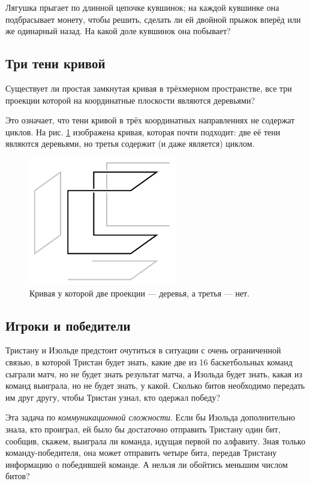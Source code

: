 Лягушка прыгает по длинной цепочке кувшинок;
на каждой кувшинке она подбрасывает монету, чтобы решить,
сделать ли ей двойной прыжок вперёд или же одинарный назад.
На какой доле кувшинок она побывает?

\subsection*{Три тени кривой}\label{Три тени кривой}

Существует ли простая замкнутая кривая в трёхмерном пространстве, все три проекции которой на координатные плоскости являются деревьями?

Это означает, что тени кривой в трёх координатных направлениях не содержат циклов.
На рис. \ref{pic:proj1} изображена кривая, которая почти подходит: две её тени являются деревьями, но третья содержит (и даже является) циклом.

\begin{figure}[htb!]
\centering
\includegraphics[scale=1]{pics/proj1}
\caption{Кривая у которой две проекции --- деревья, а третья --- нет.}
\label{pic:proj1}
\end{figure}

\subsection*{Игроки и победители}

Тристану и Изольде предстоит очутиться в ситуации с очень ограниченной связью, в которой Тристан будет знать, какие две из 16 баскетбольных команд сыграли матч, но не будет знать результат матча, а Изольда будет знать, какая из команд выиграла, но не будет знать, у какой. Сколько битов необходимо передать им друг другу, чтобы Тристан узнал, кто одержал победу?

{\sloppy

Эта задача по \emph{коммуникационной сложности}.
Если бы Изольда дополнительно знала, кто проиграл, ей было бы достаточно отправить Тристану один бит, сообщив, скажем, выиграла ли команда, идущая первой по алфавиту. Зная только команду-победителя, она может отправить четыре бита, передав Тристану информацию о победившей команде. А нельзя ли обойтись меньшим числом битов?
}

